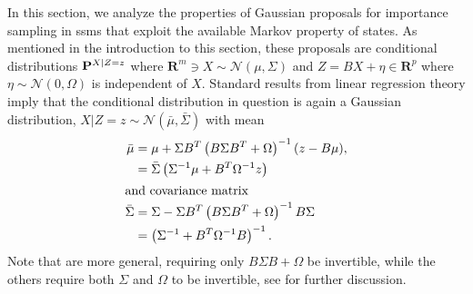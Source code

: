 \begin{tcolorbox}[title={Decide whether to keep and where to move}]
    
In this section, we analyze the properties of Gaussian proposals for importance sampling in \glspl{ssm} that exploit the available Markov property of states. As mentioned in the introduction to this section, these proposals are conditional distributions $\P^{X|Z=z}$ where $ \mathbf{R}^{m} \ni X \sim \mathcal N \left( \mu, \Sigma \right)$ and $Z = BX + \eta \in \mathbf{R}^{p}$ where $\eta\sim\mathcal N(0, \Omega)$ is independent of $X$. Standard results from linear regression theory imply that the conditional distribution in question is again a Gaussian distribution, $X|Z=z \sim \mathcal N(\bar \mu, \bar \Sigma)$ with mean
\begin{align}
    \bar \mu    & = \mu + \Sigma B^{T} \left( B \Sigma B^{T} + \Omega \right)^{-1} (z - B \mu), \label{eq:posterior_mean_1} \\
                & = \bar \Sigma\left(\Sigma^{-1}\mu + B^{T}\Omega^{-1}z \right)\label{eq:posterior_mean_2}                  \\
    \intertext{and covariance matrix}
    \bar \Sigma & = \Sigma - \Sigma B^T \left( B\Sigma B^{T} + \Omega \right) ^{-1} B \Sigma \label{eq:posterior_cov_1}     \\
                & = \left(\Sigma^{-1} + B^{T}\Omega^{-1}B\right)^{-1} \label{eq:posterior_cov_2}.
\end{align}
Note that  are more general, requiring only $B \Sigma B + \Omega$ be invertible, while the others require both $\Sigma$ and $\Omega$ to be invertible, see \cite[Lemma 7.1]{Chopin2020Introduction} for further discussion.

\end{tcolorbox}

